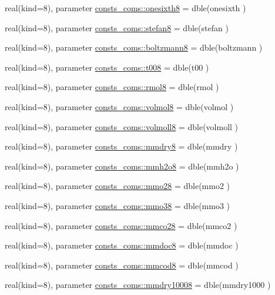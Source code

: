 \begin{DoxyCompactItemize}
real(kind=8), parameter \hyperlink{namespaceconsts__coms_a533ba43ea618917f7a64b64e74cac72e}{consts\+\_\+coms\+::onesixth8} = dble(onesixth )
\item 
real(kind=8), parameter \hyperlink{namespaceconsts__coms_a5f113af284d2f76449a49c827db77373}{consts\+\_\+coms\+::stefan8} = dble(stefan )
\item 
real(kind=8), parameter \hyperlink{namespaceconsts__coms_a46e0614f5166dcc3513d6447c2aa7212}{consts\+\_\+coms\+::boltzmann8} = dble(boltzmann )
\item 
real(kind=8), parameter \hyperlink{namespaceconsts__coms_acba5e51574aed080f17d371bbcd3cb34}{consts\+\_\+coms\+::t008} = dble(t00 )
\item 
real(kind=8), parameter \hyperlink{namespaceconsts__coms_a3addc2c9f3482a3de83c7c18c2f462f4}{consts\+\_\+coms\+::rmol8} = dble(rmol )
\item 
real(kind=8), parameter \hyperlink{namespaceconsts__coms_a2f3906a20f2db696a3a274df51b36123}{consts\+\_\+coms\+::volmol8} = dble(volmol )
\item 
real(kind=8), parameter \hyperlink{namespaceconsts__coms_af1e0f2c4db823ba0978a94ea03eb9158}{consts\+\_\+coms\+::volmoll8} = dble(volmoll )
\item 
real(kind=8), parameter \hyperlink{namespaceconsts__coms_a2eec42ad330677699998e5de193f8de3}{consts\+\_\+coms\+::mmdry8} = dble(mmdry )
\item 
real(kind=8), parameter \hyperlink{namespaceconsts__coms_a16b37e1505a8cc5ff91964cc28d72346}{consts\+\_\+coms\+::mmh2o8} = dble(mmh2o )
\item 
real(kind=8), parameter \hyperlink{namespaceconsts__coms_a737139f9eca5b72bd0b26f75910c55df}{consts\+\_\+coms\+::mmo28} = dble(mmo2 )
\item 
real(kind=8), parameter \hyperlink{namespaceconsts__coms_aea51cb10ed09215243c1e9b5499fc337}{consts\+\_\+coms\+::mmo38} = dble(mmo3 )
\item 
real(kind=8), parameter \hyperlink{namespaceconsts__coms_a8b53e3487c484355ec731d35ae57186f}{consts\+\_\+coms\+::mmco28} = dble(mmco2 )
\item 
real(kind=8), parameter \hyperlink{namespaceconsts__coms_aaab14da3d986d797ca230301cd6b3826}{consts\+\_\+coms\+::mmdoc8} = dble(mmdoc )
\item 
real(kind=8), parameter \hyperlink{namespaceconsts__coms_aae7cdd0c3c7745c9fab0969b83f90eed}{consts\+\_\+coms\+::mmcod8} = dble(mmcod )
\item 
real(kind=8), parameter \hyperlink{namespaceconsts__coms_a22496e0e01ad463e5cc3cd1b4527193f}{consts\+\_\+coms\+::mmdry10008} = dble(mmdry1000 )

\end{DoxyCompactItemize}
